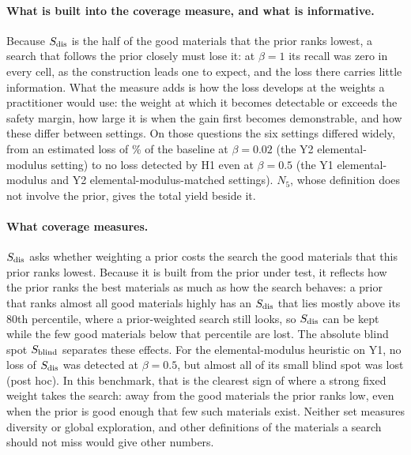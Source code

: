 \paragraph{What is built into the coverage measure, and what is informative.} Because $S_{\mathrm{dis}}$ is the half of the good materials
that the prior ranks lowest, a search that follows the prior closely must lose it: at $\beta=1$ its recall was zero in every cell, as the
construction leads one to expect, and the loss there carries little information. What the measure adds is how the loss develops at the
weights a practitioner would use: the weight at which it becomes detectable or exceeds the safety margin, how large it is when the
gain first becomes demonstrable, and how these differ between settings. On those questions the six settings differed widely,
from an estimated loss of \% of the baseline at $\beta=0.02$ (the
Y2 elemental-modulus setting) to no loss detected by H1 even at $\beta=0.5$ (the Y1 elemental-modulus and Y2
elemental-modulus-matched settings). $N_5$, whose definition does not involve the prior, gives the total yield beside it.

\paragraph{What coverage measures.} $S_{\mathrm{dis}}$ asks whether weighting a prior costs the search the good materials that this prior
ranks lowest. Because it is built from the prior under test, it reflects how the prior ranks the best materials as much as
how the search behaves: a prior that ranks almost all good materials highly has an $S_{\mathrm{dis}}$ that lies mostly above its 80th
percentile, where a prior-weighted search still looks, so $S_{\mathrm{dis}}$ can be kept while the few good materials below that
percentile are lost. The absolute blind spot $S_{\mathrm{blind}}$ separates these effects. For the
elemental-modulus heuristic on Y1, no loss of $S_{\mathrm{dis}}$ was detected at $\beta=0.5$, but almost all of its small blind spot was
lost (post hoc). In this benchmark, that is the clearest sign of where a strong fixed weight takes the search: away from the good
materials the prior ranks low, even when the prior is good enough that few such materials exist. Neither set
measures diversity or global exploration, and other definitions of the materials a search should not miss would give other
numbers.

